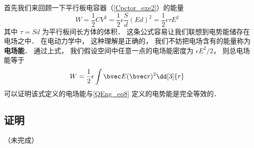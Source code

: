 
首先我们来回顾一下平行板电容器（\autoref{Cpctor_exe2}）的能量
\begin{equation}
W = \frac12 CV^2 = \frac12 \epsilon \frac Sd (Ed)^2 = \frac 12 \epsilon \tau E^2
\end{equation}
其中 $\tau = Sd$ 为平行板间长方体的体积． 这条公式容易让我们联想到电势能储存在电场之中． 在电动力学中， 这种理解是正确的， 我们不妨把电场含有的能量称为\textbf{电场能}． 通过上式， 我们假设空间中任意一点的电场能密度为 $\epsilon E^2/2$， 则总电场能等于
\begin{equation}
W = \frac12 \epsilon \int \bvec E(\bvec r)^2 \dd[3]{r}
\end{equation}
可以证明该式定义的电场能与\autoref{QEng_eq8} 定义的电势能是完全等效的．

\subsection{证明}
（未完成）
